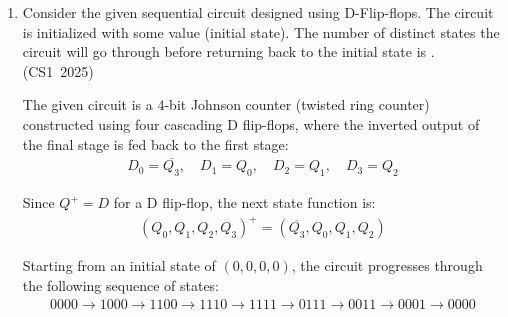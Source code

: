 \begin{enumerate}[label=\thesubsection.\arabic*, ref=\thesubsection.\theenumi]
The state-transition diagram of the minimized FSM is shown in Fig.~\ref{fig:q22_fsm_diagram}. Each transition is labelled by its input $X$.

\begin{figure}[H]
    \centering
    
    \caption{State-transition Diagram of Minimized FSM}
    \label{fig:q22_fsm_diagram}
\end{figure}

Therefore, the minimum number of states required is 5.

The following code verifies the solution:
\begin{lstlisting}[frame=single, basicstyle=\rmfamily, escapeinside={(*@}{@*)}]
(*@\makebox[\dimexpr\linewidth-2\fboxsep-2\fboxrule\relax][c]{codes/q22.c}@*)
\end{lstlisting}

\vspace{0.5cm}
\item Consider the given sequential circuit designed using D-Flip-flops. The circuit is initialized with some value (initial state). The number of distinct states the circuit will go through before returning back to the initial state is \underline{\hspace{1cm}}.
\hfill (CS1~2025)

\begin{figure}[H]
    \centering
    
\end{figure}

\vspace{0.2cm}
\solution
The given circuit is a 4-bit Johnson counter (twisted ring counter) constructed using four cascading D flip-flops, where the inverted output of the final stage is fed back to the first stage:
\begin{align}
D_0 = \overline{Q_3}, \quad D_1 = Q_0, \quad D_2 = Q_1, \quad D_3 = Q_2
\end{align}

Since $Q^+ = D$ for a D flip-flop, the next state function is:
\begin{align}
(Q_0, Q_1, Q_2, Q_3)^+ = (\overline{Q_3}, Q_0, Q_1, Q_2)
\end{align}

Starting from an initial state of $(0, 0, 0, 0)$, the circuit progresses through the following sequence of states:
\begin{align}
0000 \to 1000 \to 1100 \to 1110 \to 1111 \to 0111 \to 0011 \to 0001 \to 0000
\end{align}


\end{enumerate}
